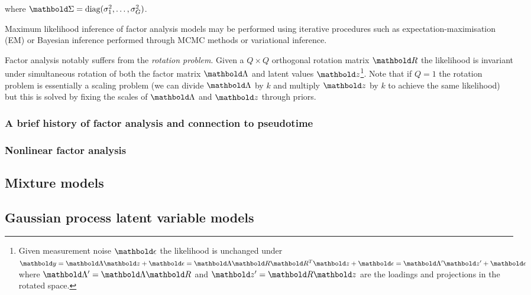 where $\mbSigma = \text{diag}(\sigma_1^2, \ldots, \sigma_G^2)$.

Maximum likelihood inference of factor analysis models may be performed using iterative procedures such as expectation-maximisation (EM) or Bayesian inference performed through MCMC methods or variational inference.

Factor analysis notably suffers from the \emph{rotation problem}. Given a $Q \times Q$ orthogonal rotation matrix $\mbR$ the likelihood is invariant under simultaneous rotation of both the factor matrix $\mbLambda$ and latent values $\mbz$\footnote{
Given measurement noise $\mbepsilon$ the likelihood is unchanged under $\mby = \mbLambda \mbz + \mbepsilon = \mbLambda \mbR \mbR^T \mbz + \mbepsilon = \mbLambda' \mbz' + \mbepsilon$ where $\mbLambda' = \mbLambda \mbR$ and $\mbz' = \mbR \mbz$ are the loadings and projections in the rotated space.
}. %
Note that if $Q=1$ the rotation problem is essentially a scaling problem (we can divide $\mbLambda$ by $k$ and multiply $\mbz$ by $k$ to achieve the same likelihood) but this is solved by fixing the scales of $\mbLambda$ and $\mbz$ through priors.

\subsubsection{A brief history of factor analysis and connection to pseudotime} \label{intr:fa_hist}


\subsubsection{Nonlinear factor analysis}

\subsection{Mixture models}

\subsection{Gaussian process latent variable models}
